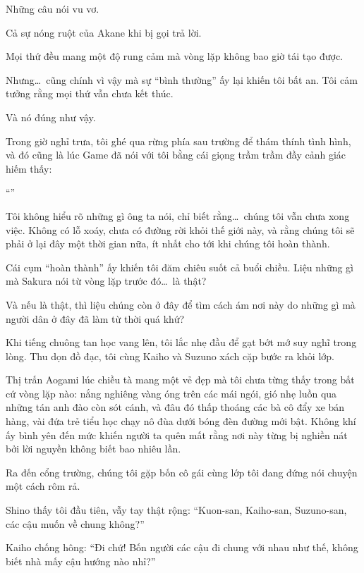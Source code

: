 \documentclass[../main.tex]{subfiles}
\begin{document}
Những câu nói vu vơ.

Cả sự nóng ruột của Akane khi bị gọi trả lời.

Mọi thứ đều mang một độ rung cảm mà vòng lặp không bao giờ tái tạo được.

Nhưng\dots\ cũng chính vì vậy mà sự  ``bình thường'' ấy lại khiến tôi bất an. Tôi cảm tưởng rằng mọi thứ vẫn chưa kết thúc.

Và nó đúng như vậy.

Trong giờ nghỉ trưa, tôi ghé qua rừng phía sau trường để thám thính tình hình, và đó cũng là lúc Game đã nói với tôi bằng cái giọng trầm trầm đầy cảnh giác hiếm thấy:

``''

Tôi không hiểu rõ những gì ông ta nói, chỉ biết rằng\dots\ chúng tôi vẫn chưa xong việc. Không có lỗ xoáy, chưa có đường rời khỏi thế giới này, và rằng chúng tôi sẽ phải ở lại đây một thời gian nữa, ít nhất cho tới khi chúng tôi hoàn thành.

Cái cụm ``hoàn thành'' ấy khiến tôi đăm chiêu suốt cả buổi chiều. Liệu những gì mà Sakura nói từ vòng lặp trước đó\dots\ là thật?

Và nếu là thật, thì liệu chúng còn ở đây để tìm cách ám nơi này do những gì mà người dân ở đây đã làm từ thời quá khứ?

\ct

Khi tiếng chuông tan học vang lên, tôi lắc nhẹ đầu để gạt bớt mớ suy nghĩ trong lòng. Thu dọn đồ đạc, tôi cùng Kaiho và Suzuno xách cặp bước ra khỏi lớp.

Thị trấn Aogami lúc chiều tà mang một vẻ đẹp mà tôi chưa từng thấy trong bất cứ vòng lặp nào: nắng nghiêng vàng óng trên các mái ngói, gió nhẹ luồn qua những tán anh đào còn sót cánh, và đâu đó thấp thoáng các bà cô đẩy xe bán hàng, vài đứa trẻ tiểu học chạy nô đùa dưới bóng đèn đường mới bật. Không khí ấy bình yên đến mức khiến người ta quên mất rằng nơi này từng bị nghiền nát bởi lời nguyền không biết bao nhiêu lần.

Ra đến cổng trường, chúng tôi gặp bốn cô gái cùng lớp tôi đang đứng nói chuyện một cách rôm rả.

Shino thấy tôi đầu tiên, vẫy tay thật rộng: ``Kuon-san, Kaiho-san, Suzuno-san, các cậu muốn về chung không?''

Kaiho chống hông: ``Đi chứ! Bốn người các cậu đi chung với nhau như thế, không biết nhà mấy cậu hướng nào nhỉ?''
\end{document}
